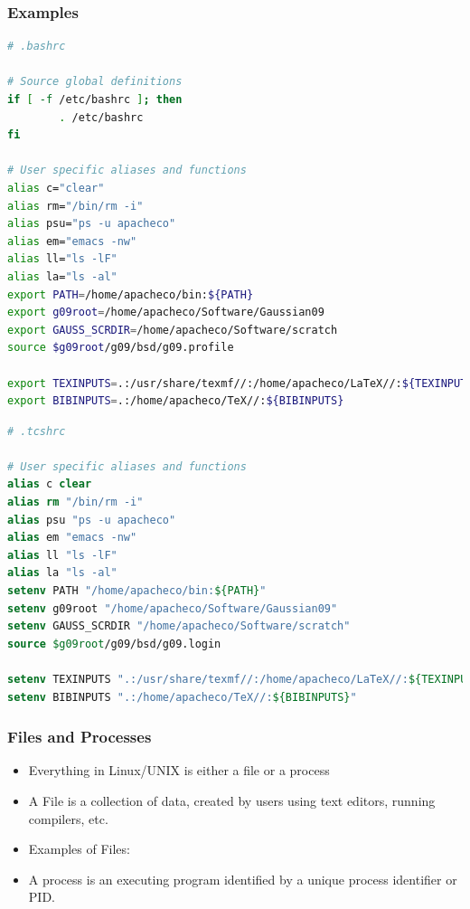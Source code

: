 \documentclass[10pt,t]{beamer}
\begin{document}
\begin{frame}
  \frametitle{\small Examples}
  \begin{lstlisting}[language=bash,basicstyle=\tiny\ttfamily]
# .bashrc

# Source global definitions
if [ -f /etc/bashrc ]; then
        . /etc/bashrc
fi

# User specific aliases and functions
alias c="clear"
alias rm="/bin/rm -i"
alias psu="ps -u apacheco"
alias em="emacs -nw"
alias ll="ls -lF"
alias la="ls -al"
export PATH=/home/apacheco/bin:${PATH}
export g09root=/home/apacheco/Software/Gaussian09
export GAUSS_SCRDIR=/home/apacheco/Software/scratch
source $g09root/g09/bsd/g09.profile

export TEXINPUTS=.:/usr/share/texmf//:/home/apacheco/LaTeX//:${TEXINPUTS}
export BIBINPUTS=.:/home/apacheco/TeX//:${BIBINPUTS}
  \end{lstlisting}

  \begin{lstlisting}[language=csh,basicstyle=\tiny\ttfamily]
# .tcshrc

# User specific aliases and functions
alias c clear
alias rm "/bin/rm -i"
alias psu "ps -u apacheco"
alias em "emacs -nw"
alias ll "ls -lF"
alias la "ls -al"
setenv PATH "/home/apacheco/bin:${PATH}"
setenv g09root "/home/apacheco/Software/Gaussian09"
setenv GAUSS_SCRDIR "/home/apacheco/Software/scratch"
source $g09root/g09/bsd/g09.login

setenv TEXINPUTS ".:/usr/share/texmf//:/home/apacheco/LaTeX//:${TEXINPUTS}"
setenv BIBINPUTS ".:/home/apacheco/TeX//:${BIBINPUTS}"
  \end{lstlisting}
\end{frame}

\begin{frame}
  \frametitle{Files and Processes}
  \begin{itemize}
    \item Everything in Linux/UNIX is either a file or a process
    \item A File is a collection of data, created by users using text editors, running compilers, etc.
    \item Examples of Files:
    \item A process is an executing program identified by a unique process identifier or PID.
  \end{itemize}
\end{frame}
\end{document}
